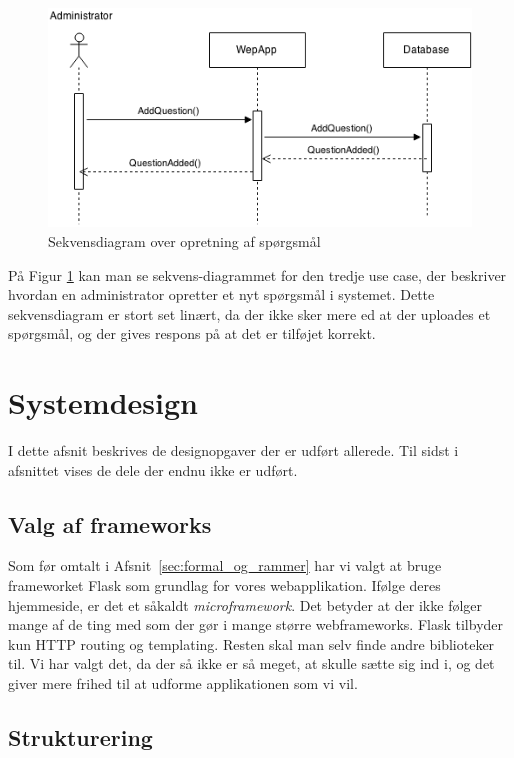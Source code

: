 \documentclass[11pt, a4paper]{article}
\begin{document}
\begin{figure}[h]
    \centering
    \includegraphics[width=0.8\linewidth]{figures/OpretSporgsmalUseCase.png}
    \caption{Sekvensdiagram over opretning af spørgsmål}
    \label{fig:opret_sp_sekvens}
\end{figure}
På Figur \ref{fig:opret_sp_sekvens} kan man se sekvens-diagrammet for den tredje use case, der beskriver hvordan en administrator opretter et nyt spørgsmål i systemet. Dette sekvensdiagram er stort set linært, da der ikke sker mere ed at der uploades et spørgsmål, og der gives respons på at det er tilføjet korrekt.

\section{Systemdesign}
\label{sec:systemdesign}

I dette afsnit beskrives de designopgaver der er udført allerede. Til sidst i afsnittet vises de dele der endnu ikke er udført.

\subsection{Valg af frameworks}
\label{sub:valg_af_frameworks}

Som før omtalt i Afsnit~\ref{sec:formal_og_rammer} har vi valgt at bruge frameworket Flask som grundlag for vores webapplikation. Ifølge deres hjemmeside\cite{flask}, er det et såkaldt \emph{microframework}. Det betyder at der ikke følger mange af de ting med som der gør i mange større webframeworks. Flask tilbyder kun HTTP routing og templating. Resten skal man selv finde andre biblioteker til. Vi har valgt det, da der så ikke er så meget, at skulle sætte sig ind i, og det giver mere frihed til at udforme applikationen som vi vil.

\subsection{Strukturering}
\label{sub:strukturering}
\end{document}
